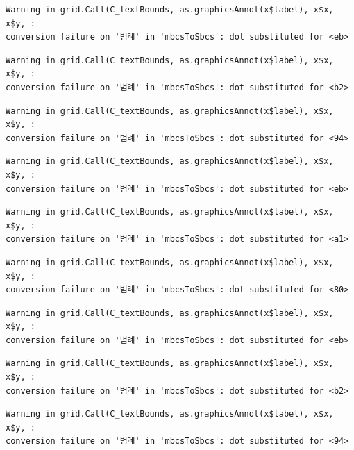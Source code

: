 \documentclass[
  letterpaper,
  DIV=11,
  numbers=noendperiod]{scrreprt}
\begin{document}
\begin{verbatim}
Warning in grid.Call(C_textBounds, as.graphicsAnnot(x$label), x$x, x$y, :
conversion failure on '범례' in 'mbcsToSbcs': dot substituted for <eb>
\end{verbatim}

\begin{verbatim}
Warning in grid.Call(C_textBounds, as.graphicsAnnot(x$label), x$x, x$y, :
conversion failure on '범례' in 'mbcsToSbcs': dot substituted for <b2>
\end{verbatim}

\begin{verbatim}
Warning in grid.Call(C_textBounds, as.graphicsAnnot(x$label), x$x, x$y, :
conversion failure on '범례' in 'mbcsToSbcs': dot substituted for <94>
\end{verbatim}

\begin{verbatim}
Warning in grid.Call(C_textBounds, as.graphicsAnnot(x$label), x$x, x$y, :
conversion failure on '범례' in 'mbcsToSbcs': dot substituted for <eb>
\end{verbatim}

\begin{verbatim}
Warning in grid.Call(C_textBounds, as.graphicsAnnot(x$label), x$x, x$y, :
conversion failure on '범례' in 'mbcsToSbcs': dot substituted for <a1>
\end{verbatim}

\begin{verbatim}
Warning in grid.Call(C_textBounds, as.graphicsAnnot(x$label), x$x, x$y, :
conversion failure on '범례' in 'mbcsToSbcs': dot substituted for <80>
\end{verbatim}

\begin{verbatim}
Warning in grid.Call(C_textBounds, as.graphicsAnnot(x$label), x$x, x$y, :
conversion failure on '범례' in 'mbcsToSbcs': dot substituted for <eb>
\end{verbatim}

\begin{verbatim}
Warning in grid.Call(C_textBounds, as.graphicsAnnot(x$label), x$x, x$y, :
conversion failure on '범례' in 'mbcsToSbcs': dot substituted for <b2>
\end{verbatim}

\begin{verbatim}
Warning in grid.Call(C_textBounds, as.graphicsAnnot(x$label), x$x, x$y, :
conversion failure on '범례' in 'mbcsToSbcs': dot substituted for <94>
\end{verbatim}
\end{document}
